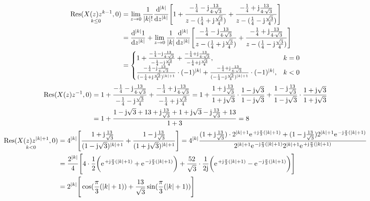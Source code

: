 \begin{align}
	\underset{k\leq0}{\mathrm{Res}(X(z)z^{k-1},0)}&=\lim\limits_{z\rightarrow0}\frac{1}{|k|!}\frac{\mathrm{d}^{|k|}}{\mathrm{d}z^{|k|}}\Bigg [1+\frac{-\frac{1}{4}-\im\frac{13}{4\cdot\sqrt{3}}}{z-(\frac{1}{4}+\im\frac{\sqrt{3}}{4})}+\frac{-\frac{1}{4}+\im\frac{13}{4\cdot\sqrt{3}}}{z-(\frac{1}{4}-\im\frac{\sqrt{3}}{4})}\Bigg]\nonumber\\
	&=\frac{\mathrm{d}^{|k|}1}{\mathrm{d}z^{|k|}}+\lim\limits_{z\rightarrow0}\frac{1}{|k|}\frac{\mathrm{d}^{|k|}}{\mathrm{d}z^{|k|}}\Bigg[\frac{-\frac{1}{4}-\im\frac{13}{4\cdot\sqrt{3}}}{z-(\frac{1}{4}+\im\frac{\sqrt{3}}{4})}+\frac{-\frac{1}{4}+\im\frac{13}{4\cdot\sqrt{3}}}{z-(\frac{1}{4}-\im\frac{\sqrt{3}}{4})}\Bigg] \nonumber \\
	&=\begin{cases}
		1+\frac{-\frac{1}{4}-\im\frac{13}{4\cdot\sqrt{3}}}{-\frac{1}{4}-\im\frac{\sqrt{3}}{4}}+\frac{-\frac{1}{4}+\im\frac{13}{4\cdot\sqrt{3}}}{-\frac{1}{4}+\im\frac{\sqrt{3}}{4}}, &k = 0 \\
		\frac{-\frac{1}{4}-\im\frac{13}{4\cdot\sqrt{3}}}{(-\frac{1}{4}+\im\frac{\sqrt{3}}{4})^{|k|+1}}\cdot(-1)^{|k|}+\frac{-\frac{1}{4}+\im\frac{13}{4\cdot\sqrt{3}}}{(-\frac{1}{4}-\im\frac{\sqrt{3}}{4})^{|k|+1}}\cdot(-1)^{|k|}, &k <0
	\end{cases}
\end{align}
\begin{align}
		\mathrm{Res}(X(z)z^{-1},0)&= 1+\frac{-\frac{1}{4}-\im\frac{13}{4\cdot\sqrt{3}}}{-\frac{1}{4}-\im\frac{\sqrt{3}}{4}}+\frac{-\frac{1}{4}+\im\frac{13}{4\cdot\sqrt{3}}}{-\frac{1}{4}+\im\frac{\sqrt{3}}{4}}=1+\frac{1+\im\frac{13}{\sqrt{3}}}{1+\im\sqrt{3}}\cdot\frac{1-\im\sqrt{3}}{1-\im\sqrt{3}}+\frac{1-\im\frac{13}{\sqrt{3}}}{1-\im\sqrt{3}}\cdot\frac{1+\im\sqrt{3}}{1+\im\sqrt{3}}\nonumber\\
		&=1+\frac{1-\im\sqrt{3}+13+\im\frac{13}{\sqrt{3}}+1+\im\sqrt{3}-\im\frac{13}{\sqrt{3}}+13}{1+3}=8
\end{align}
\begin{align}
	\underset{k<0}{\mathrm{Res}(X(z)z^{|k|+1},0)}&=4^{|k|}\Bigg[\frac{1+\im\frac{13}{\sqrt{3}}}{(1-\im\sqrt{3})^{|k|+1}}+\frac{1-\im\frac{13}{\sqrt{3}}}{(1+\im\sqrt{3})^{|k|+1}} \Bigg]=4^{|k|}\frac{(1+\im\frac{13}{\sqrt{3}})\cdot2^{|k|+1}\e^{+\im\frac{\pi}{3}(|k|+1)}+(1-\im\frac{13}{\sqrt{3}})2^{|k|+1}\e^{-\im\frac{\pi}{3}(|k|+1)}}{2^{|k|+1}\e^{-\im\frac{\pi}{3}(|k|+1)}2^{|k|+1}\e^{+\im\frac{\pi}{3}(|k|+1)}}\nonumber\\
	&=\frac{2^{|k|}}{4}\Bigg [4\cdot\frac{1}{2}\bigg(\e^{+\im\frac{\pi}{3}(|k|+1)}+\e^{-\im\frac{\pi}{3}(|k|+1)}\bigg)+\frac{52}{\sqrt{3}}\cdot\frac{1}{2\im}\bigg(\e^{+\im\frac{\pi}{3}(|k|+1)}-\e^{-\im\frac{\pi}{3}(|k|+1)}\bigg)\Bigg]\nonumber\\
	&=2^{|k|}\Bigg[\cos(\frac{\pi}{3}(|k|+1))+\frac{13}{\sqrt{3}}\sin(\frac{\pi}{3}(|k|+1))\Bigg]
\end{align}
